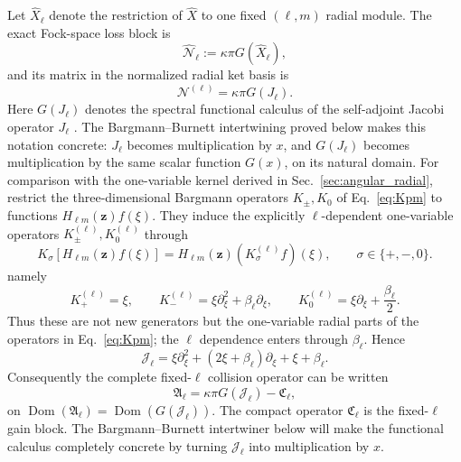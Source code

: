 \documentclass[11pt]{article}
\numberwithin{equation}{section}
\newcommand{\Dom}{\operatorname{Dom}}
\theoremstyle{definition}
\begin{document}
Let $\widehat X_\ell$ denote the restriction of $\widehat X$ to one
fixed $(\ell,m)$ radial module.  The exact Fock-space loss block is
\begin{equation}
 \widehat{\mathcal N}_\ell
 :=\kappa\pi G(\widehat X_\ell),
 \label{eq:loss_Fock}
\end{equation}
and its matrix in the normalized radial ket basis is
\begin{equation}
 \mathcal N^{(\ell)}=\kappa\pi G(J_\ell).
 \label{eq:loss_J}
\end{equation}
Here $G(J_\ell)$ denotes the spectral functional calculus of the self-adjoint
Jacobi operator $J_\ell$ \cite{ReedSimon1980}.  The Bargmann--Burnett intertwining proved below makes
this notation concrete: $J_\ell$ becomes multiplication by $x$, and
$G(J_\ell)$ becomes multiplication by the same scalar function $G(x)$, on its
natural domain.
For comparison with the one-variable kernel derived in
Sec.~\ref{sec:angular_radial}, restrict the three-dimensional Bargmann operators
$K_\pm,K_0$ of Eq.~\eqref{eq:Kpm} to functions
$H_{\ell m}(\bm z)f(\xi)$.  They induce the explicitly $\ell$-dependent
one-variable operators $K_\pm^{(\ell)},K_0^{(\ell)}$ through
\begin{equation}
 K_\sigma[H_{\ell m}(\bm z)f(\xi)]
 =H_{\ell m}(\bm z)(K_\sigma^{(\ell)}f)(\xi),
 \qquad
 \sigma\in\{+,-,0\}.
 \label{eq:Ksigma_radial_restriction}
\end{equation}
namely
\begin{equation}
 K_+^{(\ell)}=\xi,
 \qquad
 K_-^{(\ell)}=\xi\partial_\xi^2+\beta_\ell\partial_\xi,
 \qquad
 K_0^{(\ell)}=\xi\partial_\xi+\frac{\beta_\ell}{2}.
 \label{eq:Kpm_radial_one_variable}
\end{equation}
Thus these are not new generators but the one-variable radial parts of the
operators in Eq.~\eqref{eq:Kpm}; the $\ell$ dependence enters through
$\beta_\ell$.  Hence
\begin{equation}
 \mathcal J_\ell
 =\xi\partial_\xi^2
 +(2\xi+\beta_\ell)\partial_\xi
 +\xi+\beta_\ell.
 \label{eq:Jdiff}
\end{equation}
Consequently the complete fixed-$\ell$ collision operator can be written
\begin{equation}
 \boxed{
 \mathfrak A_\ell
 =\kappa\pi G(\mathcal J_\ell)-\mathfrak C_\ell,
 }
 \label{eq:radial_operator}
\end{equation}
on $\Dom(\mathfrak A_\ell)=\Dom(G(\mathcal J_\ell))$.  The compact operator
$\mathfrak C_\ell$ is the fixed-$\ell$ gain block.  The Bargmann--Burnett
intertwiner below will make the functional calculus completely concrete by
turning $\mathcal J_\ell$ into multiplication by $x$.
\end{document}
